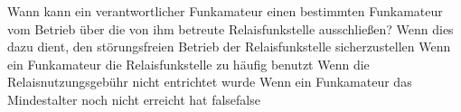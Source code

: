     {Wann kann ein verantwortlicher Funkamateur einen bestimmten Funkamateur vom Betrieb über die von ihm betreute Relaisfunkstelle ausschließen?}
    {Wenn dies dazu dient, den störungsfreien Betrieb der Relaisfunkstelle sicherzustellen}
    {Wenn ein Funkamateur die Relaisfunkstelle zu häufig benutzt}
    {Wenn die Relaisnutzungsgebühr nicht entrichtet wurde}
    {Wenn ein Funkamateur das Mindestalter noch nicht erreicht hat}
    {false}{false}